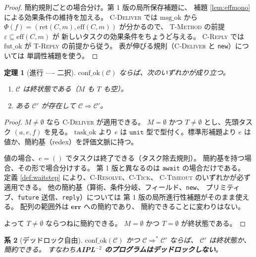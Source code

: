 \documentclass[11pt,a4paper]{ltjsarticle}
\newtheorem{theorem}{定理}
\newtheorem{corollary}[theorem]{系}
\theoremstyle{definition}
\theoremstyle{remark}
\newcommand{\tunit}{\ensuremath{\mathtt{unit}}}
\newcommand{\Ph}{\Phi}
\newcommand{\mret}{\mathrm{ret}}
\newcommand{\meff}{\mathrm{eff}}
\newcommand{\msgok}{\mathrm{msg\_ok}}
\newcommand{\taskok}{\mathrm{task\_ok}}
\newcommand{\confok}{\mathrm{conf\_ok}}
\newcommand{\futok}{\mathrm{fut\_ok}}
\newcommand{\cstep}{\Longrightarrow}
\begin{document}
\begin{proof}
簡約規則ごとの場合分け。第 1 版の局所保存補題に、
補題 \ref{lem:effmono} による効果条件の維持を加える。
\textsc{C-Deliver} では $\msgok$ から
$\Ph(f) = (\mret(C,m), \meff(C,m))$ が分かるので、
\textsc{T-Method} の前提 $\varepsilon \subseteq \meff(C,m)$ が
新しいタスクの効果条件をちょうど与える。
\textsc{C-Reply} では $\futok$ が \textsc{T-Reply} の前提から従う。
表が伸びる規則（\textsc{C-Deliver} と \texttt{new}）については
単調性補題を使う。
\end{proof}

\begin{theorem}[進行 ---- 二択]
\label{thm:prog}
$\confok(\mathcal{C})$ ならば、次のいずれかが成り立つ。
\begin{enumerate}
\item $\mathcal{C}$ は終状態である（$M$ も $T$ も空）。
\item ある $\mathcal{C}'$ が存在して $\mathcal{C} \cstep \mathcal{C}'$。
\end{enumerate}
\end{theorem}

\begin{proof}
$M \neq \emptyset$ なら \textsc{C-Deliver} が適用できる。
$M = \emptyset$ かつ $T \neq \emptyset$ とし、先頭タスク $(a,e,f)$ を見る。
$\taskok$ より $e$ は $\tunit$ 型で型付く。標準形補題より
$e$ は値か、簡約基（redex）を評価文脈に持つ。

値の場合、$e = ()$ でタスクは終了できる（タスク除去規則）。
簡約基を持つ場合、その形で場合分けする。
第 1 版と異なるのは \texttt{await} の場合だけである。
定義 \ref{def:waitstep} により、\textsc{C-Resolve}、\textsc{C-Tick}、
\textsc{C-Timeout} のいずれかが必ず適用できる。
他の簡約基（算術、条件分岐、フィールド、\texttt{new}、
プリミティブ、\texttt{future} 送信、\texttt{reply}）については
第 1 版の局所進行性補題がそのまま使える。
配列の範囲外は $\mathbf{err}$ への簡約であり、
簡約できることに変わりはない。

よって $T \neq \emptyset$ ならつねに簡約できる。
$M = \emptyset$ かつ $T = \emptyset$ が終状態である。
\end{proof}

\begin{corollary}[デッドロック自由]
\label{cor:dlfree}
$\confok(\mathcal{C})$ かつ $\mathcal{C} \cstep^{*} \mathcal{C}'$ ならば、
$\mathcal{C}'$ は終状態か、簡約できる。
すなわち\textbf{AIPL$^{-2}$ のプログラムはデッドロックしない}。
\end{corollary}
\end{document}

